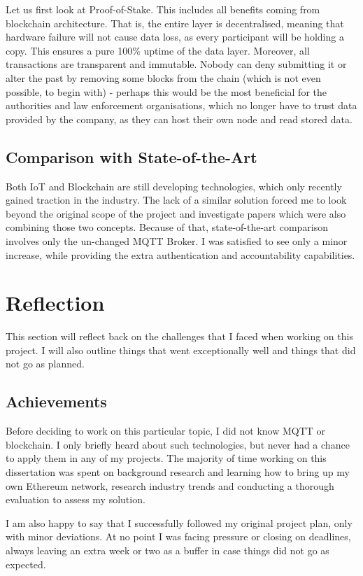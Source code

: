 Let us first look at Proof-of-Stake. This includes all benefits coming from blockchain architecture.  That is, the entire layer is decentralised, meaning that hardware failure will not cause data loss, as every participant will be holding a copy. This ensures a pure 100\% uptime of the data layer. Moreover, all transactions are transparent and immutable. Nobody can deny submitting it or alter the past by removing some blocks from the chain (which is not even possible, to begin with) - perhaps this would be the most beneficial for the authorities and law enforcement organisations, which no longer have to trust data provided by the company, as they can host their own node and read stored data.

\subsection{Comparison with State-of-the-Art}
Both IoT and Blockchain are still developing technologies, which only recently gained traction in the industry. The lack of a similar solution forced me to look beyond the original scope of the project and investigate papers which were also combining those two concepts. Because of that, state-of-the-art comparison involves only the un-changed MQTT Broker. I was satisfied to see only a minor increase, while providing the extra authentication and accountability capabilities.
\section{Reflection}
This section will reflect back on the challenges that I faced when working on this project. I will also outline things that went exceptionally well and things that did not go as planned.
\subsection{Achievements}
Before deciding to work on this particular topic, I did not know MQTT or blockchain. I only briefly heard about such technologies, but never had a chance to apply them in any of my projects. The majority of time working on this dissertation was spent on background research and learning how to bring up my own Ethereum network, research industry trends and conducting a thorough evaluation to assess my solution.

I am also happy to say that I successfully followed my original project plan, only with minor deviations. At no point I was facing pressure or closing on deadlines, always leaving an extra week or two as a buffer in case things did not go as expected.

